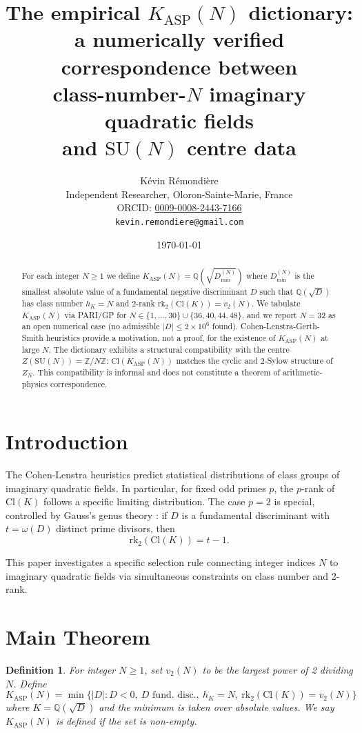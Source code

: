 \documentclass[11pt]{article}
\title{The empirical $K_{\mathrm{ASP}}(N)$ dictionary:\\
a numerically verified correspondence between\\
class-number-$N$ imaginary quadratic fields\\
and $\mathrm{SU}(N)$ centre data}
\author{K\'evin R\'emondi\`ere\\
\small Independent Researcher, Oloron-Sainte-Marie, France\\
\small ORCID: \href{https://orcid.org/0009-0008-2443-7166}{0009-0008-2443-7166}\\
\small \texttt{kevin.remondiere@gmail.com}}
\date{\today}
\newtheorem{definition}{Definition}
\theoremstyle{definition}
\begin{document}
\maketitle

\begin{abstract}
For each integer $N \geq 1$ we define $K_{\mathrm{ASP}}(N) = \mathbb{Q}(\sqrt{D_{\min}^{(N)}})$ where $D_{\min}^{(N)}$ is the smallest absolute value of a fundamental negative discriminant $D$ such that $\mathbb{Q}(\sqrt{D})$ has class number $h_K = N$ and $2$-rank $\mathrm{rk}_2(\mathrm{Cl}(K)) = v_2(N)$. We tabulate $K_{\mathrm{ASP}}(N)$ via PARI/GP for $N \in \{1,\ldots,30\}\cup\{36,40,44,48\}$, and we report $N = 32$ as an open numerical case (no admissible $|D|\leq 2\times 10^6$ found). Cohen-Lenstra-Gerth-Smith heuristics provide a motivation, not a proof, for the existence of $K_{\mathrm{ASP}}(N)$ at large $N$. The dictionary exhibits a structural compatibility with the centre $Z(\mathrm{SU}(N)) = \mathbb{Z}/N\mathbb{Z}$: $\mathrm{Cl}(K_{\mathrm{ASP}}(N))$ matches the cyclic and $2$-Sylow structure of $Z_N$. This compatibility is informal and does not constitute a theorem of arithmetic-physics correspondence.
\end{abstract}

\section{Introduction}

The Cohen-Lenstra heuristics \cite{CohenLenstra1984} predict statistical distributions of class groups of imaginary quadratic fields. In particular, for fixed odd primes $p$, the $p$-rank of $\mathrm{Cl}(K)$ follows a specific limiting distribution. The case $p = 2$ is special, controlled by Gauss's genus theory \cite{Gauss1801}: if $D$ is a fundamental discriminant with $t = \omega(D)$ distinct prime divisors, then
\[
\mathrm{rk}_2(\mathrm{Cl}(K)) = t - 1.
\]

This paper investigates a specific selection rule connecting integer indices $N$ to imaginary quadratic fields via simultaneous constraints on class number and 2-rank.

\section{Main Theorem}

\begin{definition}
For integer $N \geq 1$, set $v_2(N)$ to be the largest power of 2 dividing $N$. Define
\[
K_{\mathrm{ASP}}(N) = \min\bigl\{|D| : D < 0,\ D \text{ fund.\ disc.},\ h_K = N,\ \mathrm{rk}_2(\mathrm{Cl}(K)) = v_2(N)\bigr\}
\]
where $K = \mathbb{Q}(\sqrt{D})$ and the minimum is taken over absolute values. We say $K_{\mathrm{ASP}}(N)$ is \emph{defined} if the set is non-empty.
\end{definition}
\end{document}
